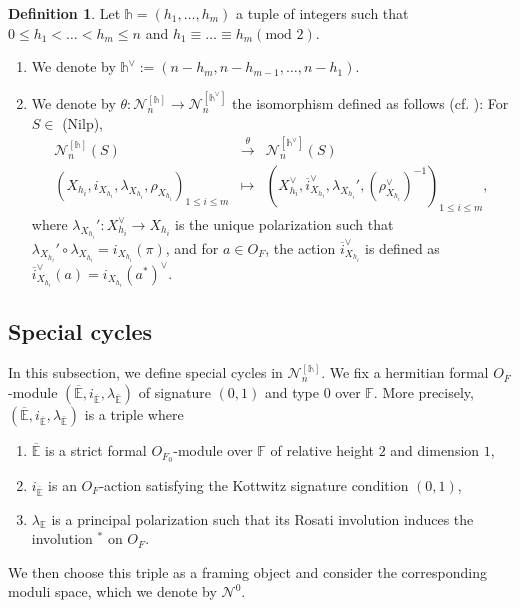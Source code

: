 \documentclass[11pt,oneside]{amsart}
\theoremstyle{plain}
\theoremstyle{definition}
\newtheorem{definition}[theorem]{Definition}
\theoremstyle{remark}
\newcommand{\tx}[1]{\text{#1}}
\newcommand{\BE}{{\mathbb E}}
\newcommand{\BF}{{\mathbb F}}
\newcommand{\CN}{{\mathcal N}}
\numberwithin{equation}{section}
\begin{document}
	\begin{definition}\label{definition3.3.3} Let $\mathds{h}=(h_1,\dots,h_m)$ a tuple of integers such that $0\leq h_1<\dots<h_m \leq n$ and $h_1 \equiv \dots \equiv h_m (\tx{mod } 2)$.
		\begin{enumerate}
			\item We denote by $\mathds{h}^{\vee}:=(n-h_m,n-h_{m-1},\dots,n-h_1)$.
			\item We denote by $\theta:\CN_n^{[\mathds{h}]} \rightarrow \CN_n^{[\mathds{h}^{\vee}]}$ the isomorphism defined as follows (cf. \cite[Remark 5.2]{cho2018basic}): For $S \in$ (Nilp),
			\begin{equation*}
				\begin{array}{ccc}
					\CN_n^{[\mathds{h}]}(S) &\overset{\theta}{\longrightarrow} &\CN_n^{[\mathds{h}^{\vee}]}(S)\\
					(X_{h_i},i_{X_{h_i}},\lambda_{X_{h_i}},\rho_{X_{h_i}})_{1 \leq i \leq m} & \mapsto &(X_{h_i}^{\vee},\overline{i}^{\vee}_{X_{h_i}},\lambda_{X_{h_i}}',(\rho^{\vee}_{X_{h_i}})^{-1})_{1 \leq i \leq m},
				\end{array}
			\end{equation*}
			where $\lambda_{X_{h_i}}':X_{h_i}^{\vee} \rightarrow X_{h_i}$ is the unique polarization such that $\lambda_{X_{h_i}}' \circ \lambda_{X_{h_i}}=i_{X_{h_i}}(\pi)$, and for $a \in O_F$, the action $\overline{i}^{\vee}_{X_{h_i}}$ is defined as $\overline{i}^{\vee}_{X_{h_i}}(a)=i_{X_{h_i}}(a^*)^{\vee}$.
		\end{enumerate}
	\end{definition}
	
	
	
	
	
	\subsection{Special cycles}
	In this subsection, we define special cycles in $\CN^{[\mathds{h}]}_n$. We fix a hermitian formal $O_F$-module $(\overline{\BE},i_{\overline{\BE}},\lambda_{\overline{\BE}})$ of signature $(0,1)$ and type $0$ over $\BF$. More precisely, $(\overline{\BE},i_{\overline{\BE}},\lambda_{\overline{\BE}})$ is a triple where
	\begin{enumerate}
		\item $\overline{\BE}$ is a strict formal $O_{F_0}$-module over $\BF$ of relative height $2$ and dimension $1,$
		\item $i_{\overline{\BE}}$ is an $O_F$-action satisfying the Kottwitz signature condition $(0,1)$,
		\item $\lambda_{\BE}$ is a principal polarization such that its Rosati involution induces the involution $^*$ on $O_F$.
	\end{enumerate}
	We then choose this triple as a framing object and consider the corresponding moduli space, which we denote by $\CN^0$.
	
\end{document}
